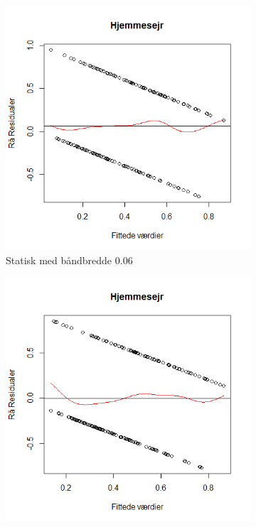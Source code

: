 \documentclass[11pt,a4paper]{article}
\begin{document}
\begin{figure}[h!]
  \centering
  \begin{subfigure}[b]{0.425\linewidth}
    \includegraphics[width=\linewidth]{ResSHS.png}
    \caption{Statisk med båndbredde 0.06}
    \label{fig:ResSHS}
  \end{subfigure}
  \begin{subfigure}[b]{0.425\linewidth}
    \includegraphics[width=\linewidth]{ResDHS.png}

\end{subfigure}
\end{figure}
\end{document}
